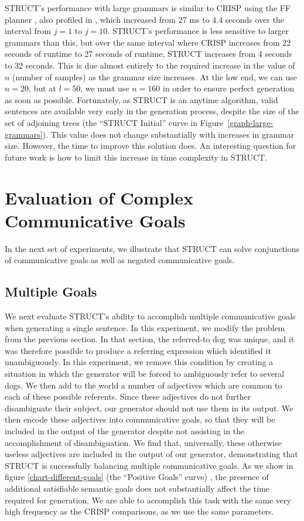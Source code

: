 STRUCT's performance with large grammars is similar to CRISP using the
FF planner \cite{hoffmann_ff_2001}, also profiled in
\cite{koller_experiences_2011}, which increased from 27 ms to 4.4
seconds over the interval from $j = 1$ to $j = 10$.  STRUCT's
performance is less sensitive to larger grammars than this, but over
the same interval where CRISP increases from 22 seconds of runtime to
27 seconds of runtime, STRUCT increases from 4 seconds to 32 seconds.
This is due almost entirely to the required increase in the value of
$n$ (number of samples) as the grammar size increases.  At the low
end, we can use $n=20$, but at $l = 50$, we must use $n = 160$ in
order to ensure perfect generation as soon as possible.  Fortunately,
as STRUCT is an anytime algorithm, valid sentences are available very
early in the generation process, despite the size of the set of
adjoining trees (the ``STRUCT Initial'' curve in
Figure~\ref{graph-large-grammars}).  This value does not change
substantially with increases in grammar size.  However, the time to
improve this solution does. An interesting question for future work is
how to limit this increase in time complexity in STRUCT. 

\section{Evaluation of Complex Communicative Goals}
In the next set of experiments, we illustrate that STRUCT can solve
conjunctions of communicative goals as well as negated communicative goals.

\subsection{Multiple Goals}
We next evaluate STRUCT's ability to accomplish
multiple communicative goals when generating a single sentence.  In this
experiment, we modify the problem from the 
previous section.  In that section, the referred-to dog was unique,
and it was therefore possible to produce a referring expression which
identified it unambiguously.  In this experiment, we remove this
condition by creating a situation in which the generator will be
forced to ambiguously refer to several dogs.  We then add to the
world a number of adjectives which are common to each of these
possible referents.  Since these adjectives do not further
disambiguate their subject, our generator should not use
them in its output.  We then encode these adjectives into
communicative goals, so that they will be included in the output of
the generator despite not assisting in the accomplishment of
disambiguation.  We find that, universally, these otherwise useless
adjectives are included in the output of our generator, demonstrating
that STRUCT is successfully balancing multiple communicative goals.
As we show in figure \ref{chart-different-goals} (the ``Positive
Goals'' curve) , the presence of additional satisfiable semantic goals does
not substantially affect the time required for generation.  We are able to
accomplish this task with the same very high frequency as the CRISP
comparisons, as we use the same parameters.

